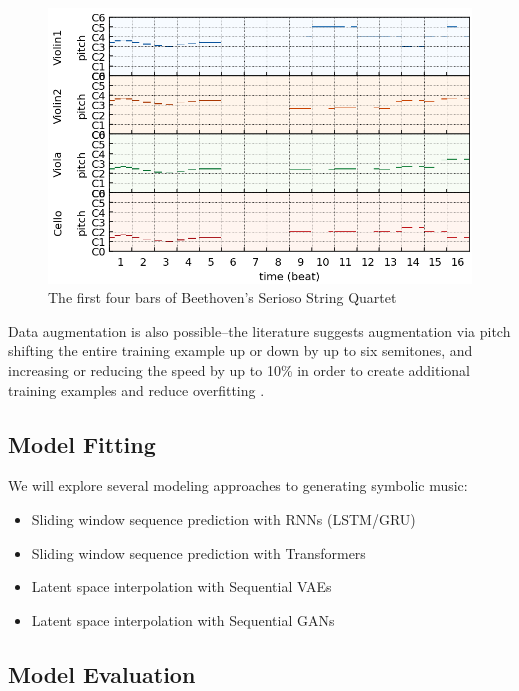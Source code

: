 \documentclass[sigconf,authorversion]{acmart}
\begin{document}
\begin{figure}[h]
  \centering
  \includegraphics[width=\linewidth]{first_four_bars.png}
  \caption{The first four bars of Beethoven's Serioso String Quartet}
\end{figure}

Data augmentation is also possible--the literature suggests augmentation via
pitch shifting the entire training example up or down by up to six semitones,
and increasing or reducing the speed by up to 10\% in order to create additional
training examples and reduce overfitting \cite{oore_this_2018}.

\subsection{Model Fitting}

We will explore several modeling approaches to generating symbolic music:

\begin{itemize}
  \item{Sliding window sequence prediction with RNNs (LSTM/GRU)}
  \item{Sliding window sequence prediction with Transformers}
  \item{Latent space interpolation with Sequential VAEs}
  \item{Latent space interpolation with Sequential GANs}
\end{itemize}

\subsection{Model Evaluation}
\end{document}
